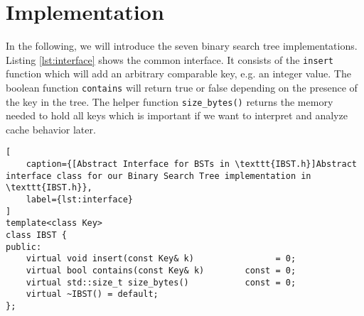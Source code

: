 \documentclass{article}
\begin{document}
\begin{table}[H]
    \captionsetup{type=table}
    \centering
    
    \caption[Branch Misprediction Penalty]{Branch Misprediction Penalty and Optimistic Load Cost used in \textit{LLVM}'s heuristics for various Intel and ARM architectures.}
    \label{tab:misprediction_penalty}
\end{table}

\section{Implementation}
In the following, we will introduce the seven binary search tree implementations. Listing \ref{lst:interface} shows the common interface. It consists of the \texttt{insert} function which will add an arbitrary comparable key, e.g. an integer value. The boolean function \texttt{contains} will return true or false depending on the presence of the key in the tree. The helper function \texttt{size\_bytes()} returns the memory needed to hold all keys which is important if we want to interpret and analyze cache behavior later. 
\begin{lstlisting}[
    caption={[Abstract Interface for BSTs in \texttt{IBST.h}]Abstract interface class for our Binary Search Tree implementation in \texttt{IBST.h}},
    label={lst:interface}
]
template<class Key>
class IBST {
public:
    virtual void insert(const Key& k)                = 0;
    virtual bool contains(const Key& k)        const = 0;
    virtual std::size_t size_bytes()           const = 0;
    virtual ~IBST() = default;
};
\end{lstlisting}
\end{document}
